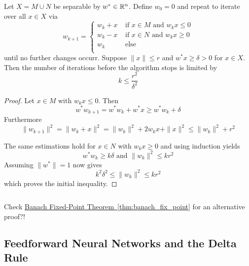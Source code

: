 \begin{theorem}\label{thm:perceptron_convergence}
    Let \( X = M \cup N \) be separable by \( w^*\in \mathbb{R}^n \). Define \( w_0 = 0 \)
    and repeat to iterate over all \( x \in X \) via
    \[
        w_{k + 1} = \left \{
        \begin{array}{ll}
            w_k + x & \text{ if } x \in M \text{ and } w_k x \le 0 \\
            w_k - x & \text{ if } x \in N \text{ and } w_k x \ge 0 \\
            w_k     & \text{ else }                                \\
        \end{array}
        \right.
    \]
    until no further changes occurr. Suppose \( \|x\| \le r \)  and \( w^*x \ge \delta > 0 \)
    for \( x \in X \). Then the number of iterations before the algorithm stops is limited by
    \[
        k\le \frac{r^2}{\delta^2}
    \]
\end{theorem}

\begin{proof}
    Let \( x \in M \) with \( w_k x \le 0 \). Then
    \[
        w^*w_{k + 1} = w^*w_k + w^*x \ge w^*w_k + \delta
    \]
    Furthermore
    \[
        \|w_{k + 1}\|^2 = \|w_k + x\|^2 = \|w_k\|^2 + 2w_k x + \|x\|^2 \le \|w_k\|^2 + r^2
    \]

    The same estimations hold for \( x \in N \) with \( w_k x \ge 0 \) and using induction yields
    \[
        w^*w_k \ge k\delta \text{ and } \|w_k\|^2 \le kr^2
    \]
    Assuming \( \|w^*\| = 1\) now gives
    \[
        k^2\delta^2 \le \|w_k\|^2 \le kr^2
    \]
    which proves the initial inequality.
\end{proof}
\bigskip


\begin{algorithm}[Perceptron]\label{algo:perceptron}
\end{algorithm}
\inputminted[fontsize=\small, framesep=0.35cm, frame=lines, python3=true]{python}{python/perceptron.py}
\bigskip


\begin{remark}
    Check \hyperref[thm:banach_fix_point]{Banach Fixed-Point Theorem~\ref*{thm:banach_fix_point}}
    for an alternative proof?!
\end{remark}
\bigskip


\subsection{Feedforward Neural Networks and the Delta Rule}
\bigskip


